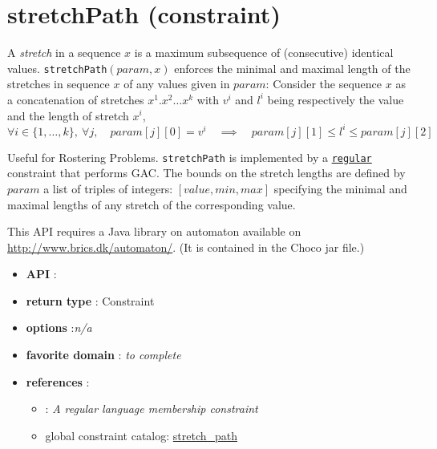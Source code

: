 \label{stretchpath}
\hypertarget{stretchpath}{}

\section{stretchPath (constraint)}\label{stretchpath:stretchpathconstraint}\hypertarget{stretchpath:stretchpathconstraint}{}


\begin{notedef}
  A \emph{stretch} in a sequence $x$ is a maximum subsequence of (consecutive) identical values.  
  \texttt{stretchPath}$(param,x)$ enforces the minimal and maximal length of the stretches in sequence $x$ of any values given in $param$:
Consider the sequence $x$ as a concatenation of stretches $x^1.x^2\ldots x^k$ with $v^i$ and $l^i$ being respectively the value and the length of stretch $x^i$,
$$\forall i\in\{1,\ldots,k\},\ \forall j,\quad param[j][0]=v^i\quad\implies\quad param[j][1]\le l^i\le param[j][2]$$
\end{notedef}


Useful for Rostering Problems. \texttt{stretchPath} is implemented by a \hyperlink{regular}{\texttt{regular}} constraint that performs GAC. The bounds on the stretch lengths are defined by $param$ a list of triples of integers: $[value, min, max]$ specifying the minimal and maximal lengths of any stretch of the corresponding value. 

This API requires a Java library on automaton available on \href{http://www.brics.dk/automaton/}{http://www.brics.dk/automaton/}. (It is contained in the Choco jar file.)

\begin{itemize}
	\item \textbf{API} : 
	\item \textbf{return type} : Constraint
	\item \textbf{options} :\emph{n/a}
	\item \textbf{favorite domain} : \emph{to complete}
	\item \textbf{references} :
      \begin{itemize}
      \item \cite{PesantCP04}: \emph{A regular language membership constraint}
      \item global constraint catalog: \href{http://www.emn.fr/x-info/sdemasse/gccat/Cstretch_path.html}{stretch\_path}
      \end{itemize}
\end{itemize}


